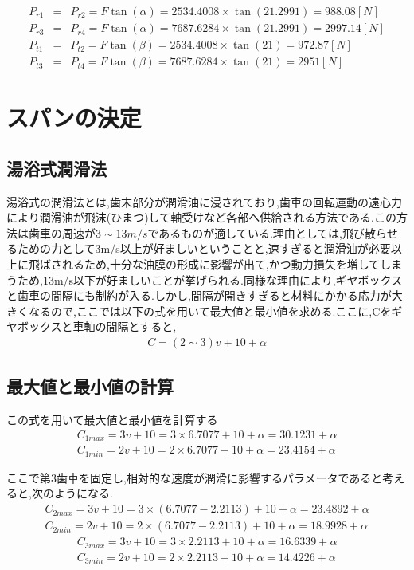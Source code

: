 \documentclass[a4j,twoside,openright,11pt]{jreport}
\begin{document}
\begin{eqnarray}
P_{r1} &=&P_{r2} = F\tan(\alpha) = 2534.4008 \times \tan(21.2991) = 988.08[N]\\
P_{r3} &=&P_{r4} = F\tan(\alpha) = 7687.6284 \times \tan(21.2991) = 2997.14[N]\\
P_{t1} &=&P_{t2} = F\tan(\beta) = 2534.4008 \times \tan(21) = 972.87[N]\\
P_{t3} &=&P_{t4} = F\tan(\beta) = 7687.6284 \times \tan(21) = 2951[N]
\end{eqnarray}

\section{スパンの決定}
\subsection{湯浴式潤滑法}
湯浴式の潤滑法とは,歯末部分が潤滑油に浸されており,歯車の回転運動の遠心力により潤滑油が飛沫(ひまつ)して軸受けなど各部へ供給される方法である.この方法は歯車の周速が$3\sim13m/s$であるものが適している.理由としては,飛び散らせるための力として3m/s以上が好ましいということと,速すぎると潤滑油が必要以上に飛ばされるため,十分な油膜の形成に影響が出て,かつ動力損失を増してしまうため,13m/s以下が好ましいことが挙げられる.同様な理由により,ギヤボックスと歯車の間隔にも制約が入る.しかし,間隔が開きすぎると材料にかかる応力が大きくなるので,ここでは以下の式を用いて最大値と最小値を求める.ここに,Cをギヤボックスと車軸の間隔とすると,
\begin{eqnarray}
C=(2\sim3)v+10 + \alpha
\end{eqnarray}
\subsection{最大値と最小値の計算}
この式を用いて最大値と最小値を計算する
\begin{eqnarray}
C_{1max}=3v+10=3 \times 6.7077 + 10 +\alpha = 30.1231 +\alpha\\
C_{1min}=2v+10=2 \times 6.7077 + 10 +\alpha = 23.4154 +\alpha
\end{eqnarray}
\par
ここで第3歯車を固定し,相対的な速度が潤滑に影響するパラメータであると考えると,次のようになる.
\begin{eqnarray}
C_{2max}=3v+10=3 \times (6.7077-2.2113) + 10 +\alpha = 23.4892 +\alpha\\
C_{2min}=2v+10=2 \times (6.7077-2.2113) + 10 +\alpha = 18.9928 +\alpha
\end{eqnarray}
\begin{eqnarray}
C_{3max}=3v+10=3 \times 2.2113 + 10 +\alpha = 16.6339 +\alpha\\
C_{3min}=2v+10=2 \times 2.2113 + 10 +\alpha = 14.4226 +\alpha
\end{eqnarray}
\end{document}
